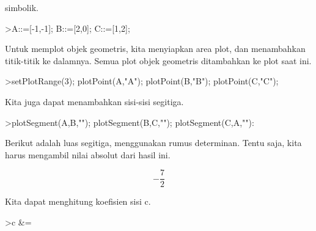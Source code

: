 \documentclass[a4paper,10pt]{article}
\begin{document}
\begin{eulernotebook}
\begin{eulercomment}
\begin{eulercomment}
\begin{eulercomment}
\begin{eulercomment}
\begin{eulercomment}
\begin{eulercomment}
\begin{eulercomment}
\begin{eulercomment}
\begin{eulercomment}
\begin{eulercomment}
\begin{eulercomment}
\begin{eulercomment}
\begin{eulercomment}
\begin{eulercomment}
\begin{eulercomment}
\begin{eulercomment}
\begin{eulercomment}
\begin{eulercomment}
\begin{eulercomment}
\begin{eulercomment}
\begin{eulercomment}
\begin{eulercomment}
\begin{eulercomment}
\begin{eulercomment}
\begin{eulercomment}
\begin{eulercomment}
\begin{eulercomment}
\begin{eulercomment}
\begin{eulercomment}
\begin{eulercomment}
\begin{eulercomment}
\begin{eulercomment}
\begin{eulercomment}
\begin{eulercomment}
\begin{eulercomment}
\begin{eulercomment}
\begin{eulercomment}
\begin{eulercomment}
\begin{eulercomment}
\begin{eulercomment}
\begin{eulercomment}
\begin{eulercomment}
\begin{eulercomment}
\begin{eulercomment}
\begin{eulercomment}
\begin{eulercomment}
\begin{eulercomment}
\begin{eulercomment}
\begin{eulercomment}
\begin{eulercomment}
\begin{eulercomment}
\begin{eulercomment}
\begin{eulercomment}
\begin{eulercomment}
\begin{eulercomment}
\begin{eulercomment}
\begin{eulercomment}
\begin{eulercomment}
\begin{eulercomment}
\begin{eulercomment}
\begin{eulercomment}
\begin{eulercomment}
\begin{eulercomment}
simbolik.
\end{eulercomment}
\begin{eulerprompt}
>A::=[-1,-1]; B::=[2,0]; C::=[1,2];
\end{eulerprompt}
\begin{eulercomment}
Untuk memplot objek geometris, kita menyiapkan area plot, dan
menambahkan titik-titik ke dalamnya. Semua plot objek geometris
ditambahkan ke plot saat ini.
\end{eulercomment}
\begin{eulerprompt}
>setPlotRange(3); plotPoint(A,"A"); plotPoint(B,"B"); plotPoint(C,"C");
\end{eulerprompt}
\begin{eulercomment}
Kita juga dapat menambahkan sisi-sisi segitiga.
\end{eulercomment}
\begin{eulerprompt}
>plotSegment(A,B,""); plotSegment(B,C,""); plotSegment(C,A,""):
\end{eulerprompt}
\begin{eulercomment}
Berikut adalah luas segitiga, menggunakan rumus determinan. Tentu
saja, kita harus mengambil nilai absolut dari hasil ini.
\end{eulercomment}
\begin{eulerformula}
\[
-\frac{7}{2}
\]
\end{eulerformula}
\begin{eulercomment}
Kita dapat menghitung koefisien sisi c.
\end{eulercomment}
\begin{eulerprompt}
>c &= 
\end{eulerprompt}
\end{eulercomment}
\end{eulercomment}
\end{eulercomment}
\end{eulercomment}
\end{eulercomment}
\end{eulercomment}
\end{eulercomment}
\end{eulercomment}
\end{eulercomment}
\end{eulercomment}
\end{eulercomment}
\end{eulercomment}
\end{eulercomment}
\end{eulercomment}
\end{eulercomment}
\end{eulercomment}
\end{eulercomment}
\end{eulercomment}
\end{eulercomment}
\end{eulercomment}
\end{eulercomment}
\end{eulercomment}
\end{eulercomment}
\end{eulercomment}
\end{eulercomment}
\end{eulercomment}
\end{eulercomment}
\end{eulercomment}
\end{eulercomment}
\end{eulercomment}
\end{eulercomment}
\end{eulercomment}
\end{eulercomment}
\end{eulercomment}
\end{eulercomment}
\end{eulercomment}
\end{eulercomment}
\end{eulercomment}
\end{eulercomment}
\end{eulercomment}
\end{eulercomment}
\end{eulercomment}
\end{eulercomment}
\end{eulercomment}
\end{eulercomment}
\end{eulercomment}
\end{eulercomment}
\end{eulercomment}
\end{eulercomment}
\end{eulercomment}
\end{eulercomment}
\end{eulercomment}
\end{eulercomment}
\end{eulercomment}
\end{eulercomment}
\end{eulercomment}
\end{eulercomment}
\end{eulercomment}
\end{eulercomment}
\end{eulercomment}
\end{eulercomment}
\end{eulercomment}
\end{eulernotebook}
\end{document}
